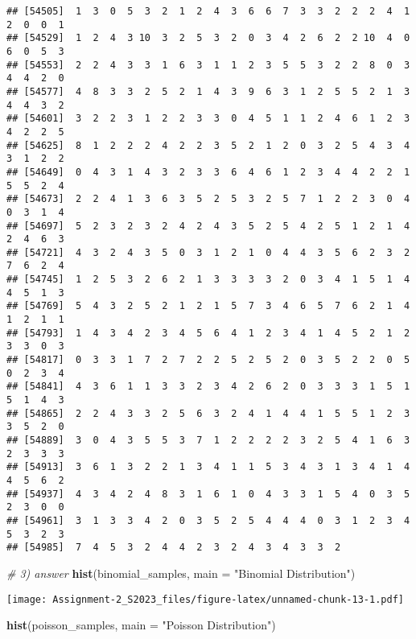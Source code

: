 \documentclass[
]{article}
\newenvironment{Shaded}{\begin{snugshade}}{\end{snugshade}}
\newcommand{\AttributeTok}[1]{\textcolor[rgb]{0.13,0.29,0.53}{#1}}
\newcommand{\CommentTok}[1]{\textcolor[rgb]{0.56,0.35,0.01}{\textit{#1}}}
\newcommand{\FunctionTok}[1]{\textcolor[rgb]{0.13,0.29,0.53}{\textbf{#1}}}
\newcommand{\NormalTok}[1]{#1}
\newcommand{\StringTok}[1]{\textcolor[rgb]{0.31,0.60,0.02}{#1}}
\begin{document}
\begin{verbatim}
## [54505]  1  3  0  5  3  2  1  2  4  3  6  6  7  3  3  2  2  2  4  1  2  0  0  1
## [54529]  1  2  4  3 10  3  2  5  3  2  0  3  4  2  6  2  2 10  4  0  6  0  5  3
## [54553]  2  2  4  3  3  1  6  3  1  1  2  3  5  5  3  2  2  8  0  3  4  4  2  0
## [54577]  4  8  3  3  2  5  2  1  4  3  9  6  3  1  2  5  5  2  1  3  4  4  3  2
## [54601]  3  2  2  3  1  2  2  3  3  0  4  5  1  1  2  4  6  1  2  3  4  2  2  5
## [54625]  8  1  2  2  2  4  2  2  3  5  2  1  2  0  3  2  5  4  3  4  3  1  2  2
## [54649]  0  4  3  1  4  3  2  3  3  6  4  6  1  2  3  4  4  2  2  1  5  5  2  4
## [54673]  2  2  4  1  3  6  3  5  2  5  3  2  5  7  1  2  2  3  0  4  0  3  1  4
## [54697]  5  2  3  2  3  2  4  2  4  3  5  2  5  4  2  5  1  2  1  4  2  4  6  3
## [54721]  4  3  2  4  3  5  0  3  1  2  1  0  4  4  3  5  6  2  3  2  7  6  2  4
## [54745]  1  2  5  3  2  6  2  1  3  3  3  3  2  0  3  4  1  5  1  4  4  5  1  3
## [54769]  5  4  3  2  5  2  1  2  1  5  7  3  4  6  5  7  6  2  1  4  1  2  1  1
## [54793]  1  4  3  4  2  3  4  5  6  4  1  2  3  4  1  4  5  2  1  2  3  3  0  3
## [54817]  0  3  3  1  7  2  7  2  2  5  2  5  2  0  3  5  2  2  0  5  0  2  3  4
## [54841]  4  3  6  1  1  3  3  2  3  4  2  6  2  0  3  3  3  1  5  1  5  1  4  3
## [54865]  2  2  4  3  3  2  5  6  3  2  4  1  4  4  1  5  5  1  2  3  3  5  2  0
## [54889]  3  0  4  3  5  5  3  7  1  2  2  2  2  3  2  5  4  1  6  3  2  3  3  3
## [54913]  3  6  1  3  2  2  1  3  4  1  1  5  3  4  3  1  3  4  1  4  4  5  6  2
## [54937]  4  3  4  2  4  8  3  1  6  1  0  4  3  3  1  5  4  0  3  5  2  3  0  0
## [54961]  3  1  3  3  4  2  0  3  5  2  5  4  4  4  0  3  1  2  3  4  5  3  2  3
## [54985]  7  4  5  3  2  4  4  2  3  2  4  3  4  3  3  2
\end{verbatim}

\begin{Shaded}
\begin{Highlighting}[]
\CommentTok{\# 3) answer}
\FunctionTok{hist}\NormalTok{(binomial\_samples, }\AttributeTok{main =} \StringTok{"Binomial Distribution"}\NormalTok{)}
\end{Highlighting}
\end{Shaded}

\texttt{[image: Assignment-2\_S2023\_files/figure-latex/unnamed-chunk-13-1.pdf]}

\begin{Shaded}
\begin{Highlighting}[]
\FunctionTok{hist}\NormalTok{(poisson\_samples, }\AttributeTok{main =} \StringTok{"Poisson Distribution"}\NormalTok{)}
\end{Highlighting}
\end{Shaded}
\end{document}
